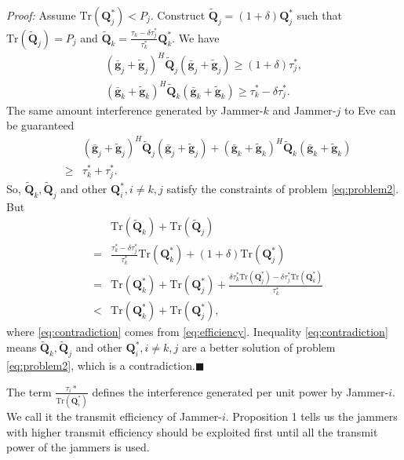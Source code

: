 \documentclass[12pt, journal,onecolumn,draftclsnofoot]{IEEEtran}
\begin{document}
\emph{Proof:} Assume $\mathrm{Tr}(\mathbf{Q}_j^*) < P_j$. Construct $\tilde{\mathbf{Q}}_j = (1 + \delta) \mathbf{Q}_j^*$ such that $\mathrm{Tr}(\tilde{\mathbf{Q}}_j) = P_j$ and $\tilde{\mathbf{Q}}_k = \frac{\tau_k - \delta\tau_j^*}{\tau_k^*} \mathbf{Q}_k^*$. We have
\begin{eqnarray}
(\bar{\mathbf{g}}_j+\tilde{\mathbf{g}}_j)^H\tilde{\mathbf{Q}}_j(\bar{\mathbf{g}}_j+\tilde{\mathbf{g}}_j)\geq (1+ \delta)\tau_j^*,\\
(\bar{\mathbf{g}}_k+\tilde{\mathbf{g}}_k)^H\tilde{\mathbf{Q}}_k(\bar{\mathbf{g}}_k+\tilde{\mathbf{g}}_k) \geq \tau_k^* - \delta\tau_j^*.
\end{eqnarray}
The same amount interference generated by Jammer-$k$ and Jammer-$j$ to Eve can be guaranteed
\begin{eqnarray}
&&(\bar{\mathbf{g}}_j+\tilde{\mathbf{g}}_j)^H\tilde{\mathbf{Q}}_j(\bar{\mathbf{g}}_j+\tilde{\mathbf{g}}_j) \nonumber+ (\bar{\mathbf{g}}_k+\tilde{\mathbf{g}}_k)^H\tilde{\mathbf{Q}}_k(\bar{\mathbf{g}}_k+\tilde{\mathbf{g}}_k)\nonumber\\
&\geq&  \tau_k^* + \tau_j^*.
\end{eqnarray}
So, $\tilde{\mathbf{Q}}_k, \tilde{\mathbf{Q}}_j$ and other $\mathbf{Q}_i^*, i \neq k,j$ satisfy the constraints of problem \eqref{eq:problem2}. But
\begin{eqnarray}
&&\mathrm{Tr}(\tilde{\mathbf{Q}}_k) + \mathrm{Tr}(\tilde{\mathbf{Q}}_j)\\
&=&\frac{\tau_k^* - \delta\tau_j^*}{\tau_k^*} \mathrm{Tr}(\mathbf{Q}_k^*)  + (1 + \delta)\mathrm{Tr}(\mathbf{Q}_j^*)\\
&=&\mathrm{Tr}(\mathbf{Q}_k^*) + \mathrm{Tr}(\mathbf{Q}_j^*) + \frac{\delta\tau_k^*\mathrm{Tr}(\mathbf{Q}_j^*)-\delta\tau_j^*\mathrm{Tr}(\mathbf{Q}_k^*)}{\tau_k^*}\\
&<&\mathrm{Tr}(\mathbf{Q}_k^*) + \mathrm{Tr}(\mathbf{Q}_j^*), \label{eq:contradiction}
\end{eqnarray}
where \eqref{eq:contradiction} comes from  \eqref{eq:efficiency}.
Inequality \eqref{eq:contradiction} means $\tilde{\mathbf{Q}}_k, \tilde{\mathbf{Q}}_j$ and other $\mathbf{Q}_i^*, i \neq k,j$ are a better solution of problem \eqref{eq:problem2}, which is a contradiction.$\blacksquare$

The term $\frac{\tau_i*}{\mathrm{Tr}(\mathbf{Q}_i^*)}$ defines the interference generated per unit power by Jammer-$i$. We call it the transmit efficiency of Jammer-$i$. Proposition 1 tells us the jammers with higher transmit efficiency should be exploited first until all the transmit power of the jammers is used.
\end{document}
